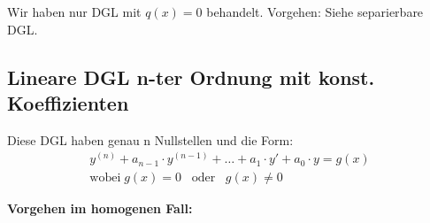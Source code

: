 Wir haben nur DGL mit $q(x) = 0$ behandelt.
Vorgehen: Siehe separierbare DGL.

\subsection{Lineare DGL n-ter Ordnung {\footnotesize mit konst. Koeffizienten}}
Diese DGL haben genau n Nullstellen und die Form:
\begin{eqnarray*}
	y^{(n)}+a_{n-1} \cdot y^{(n-1)}+\ldots+a_1 \cdot y' +a_0 \cdot y=g(x)\\
	\text{wobei} \; g(x) = 0 \hspace{10pt} \text{oder} \hspace{10pt} g(x) \neq 0
\end{eqnarray*}

\textbf{Vorgehen im homogenen Fall:}
